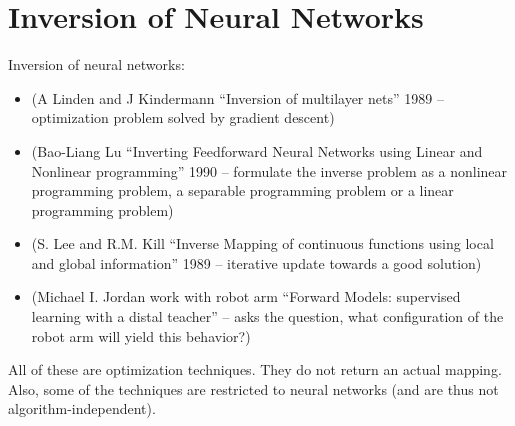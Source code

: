 \section{Inversion of Neural Networks}
Inversion of neural networks: 
\begin{itemize}
\item (A Linden and J Kindermann ``Inversion of multilayer nets'' 1989 -- optimization problem solved by gradient descent) 
\item (Bao-Liang Lu ``Inverting Feedforward Neural Networks using Linear and Nonlinear programming'' 1990 -- formulate the inverse problem as a nonlinear programming problem, a separable programming problem or a linear programming problem)
\item (S. Lee and R.M. Kill ``Inverse Mapping of continuous functions using local and global information'' 1989 -- iterative update towards a good solution)
\item (Michael I. Jordan work with robot arm ``Forward Models: supervised learning with a distal teacher'' -- asks the question, what configuration of the robot arm will yield this behavior?)
\end{itemize}
All of these are optimization techniques. They do not return an actual mapping. Also, some of the techniques are restricted to neural networks (and are thus not algorithm-independent).





